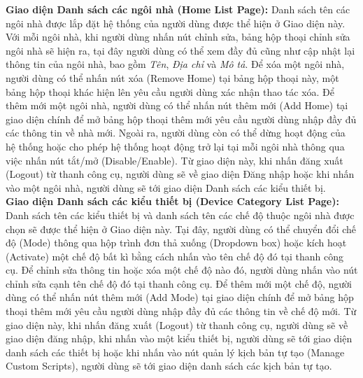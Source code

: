 \documentclass[12pt,a4paper,oneside]{extbook}
\begin{document}
\noindent
\textbf{Giao diện Danh sách các ngôi nhà (Home List Page):} Danh sách tên các ngôi nhà được lắp đặt hệ thống của người dùng được thể hiện ở Giao diện này. Với mỗi ngôi nhà, khi người dùng nhấn nút chỉnh sửa, bảng hộp thoại chỉnh sửa ngôi nhà sẽ hiện ra, tại đây người dùng có thể xem đầy đủ cũng như cập nhật lại thông tin của ngôi nhà, bao gồm \textit{Tên}, \textit{Địa chỉ} và \textit{Mô tả}. Để xóa một ngôi nhà, người dùng có thể nhấn nút xóa (Remove Home) tại bảng hộp thoại này, một bảng hộp thoại khác hiện lên yêu cầu người dùng xác nhận thao tác xóa. Để thêm mới một ngôi nhà, người dùng có thể nhấn nút thêm mới (Add Home) tại giao diện chính để mở bảng hộp thoại thêm mới yêu cầu người dùng nhập đầy đủ các thông tin về nhà mới. Ngoài ra, người dùng còn có thể dừng hoạt động của hệ thống hoặc cho phép hệ thống hoạt động trở lại tại mỗi ngôi nhà thông qua việc nhấn nút tắt/mở (Disable/Enable). Từ giao diện này, khi nhấn đăng xuất (Logout) từ thanh công cụ, người dùng sẽ về giao diện Đăng nhập hoặc khi nhấn vào một ngôi nhà, người dùng sẽ tới giao diện Danh sách các kiểu thiết bị.\\

\noindent
\textbf{Giao diện Danh sách các kiểu thiết bị (Device Category List Page):} Danh sách tên các kiểu thiết bị và danh sách tên các chế độ thuộc ngôi nhà được chọn sẽ được thể hiện ở Giao diện này. Tại đây, người dùng có thể chuyển đổi chế độ (Mode) thông qua hộp trình đơn thả xuống (Dropdown box) hoặc kích hoạt (Activate) một chế độ bất kì bằng cách nhấn vào tên chế độ đó tại thanh công cụ. Để chỉnh sửa thông tin hoặc xóa một chế độ nào đó, người dùng nhấn vào nút chỉnh sửa cạnh tên chế độ đó tại thanh công cụ. Để thêm mới một chế độ, người dùng có thể nhấn nút thêm mới (Add Mode) tại giao diện chính để mở bảng hộp thoại thêm mới yêu cầu người dùng nhập đầy đủ các thông tin về chế độ mới. Từ giao diện này, khi nhấn đăng xuất (Logout) từ thanh công cụ, người dùng sẽ về giao diện đăng nhập, khi nhấn vào một kiểu thiết bị, người dùng sẽ tới giao diện danh sách các thiết bị hoặc khi nhấn vào nút quản lý kịch bản tự tạo (Manage Custom Scripts), người dùng sẽ tới giao diện danh sách các kịch bản tự tạo.\\
\end{document}
